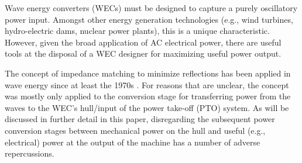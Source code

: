 \documentclass[lettersize,journal]{IEEEtran}
\begin{document}


Wave energy converters (WECs) must be designed to capture a purely oscillatory power input.
Amongst other energy generation technologies (e.g., wind turbines, hydro-electric dams, nuclear power plants), this is a unique characteristic.
However, given the broad application of AC electrical power, there are useful tools at the disposal of a WEC designer for maximizing useful power output.

The concept of impedance matching to minimize reflections has been applied in wave energy since at least the 1970s \cite{Falnes:1980aa}.
For reasons that are unclear, the concept was mostly only applied to the conversion stage for transferring power from the waves to the WEC's hull/input of the power take-off (PTO) system.
As will be discussed in further detail in this paper, disregarding the subsequent power conversion stages between mechanical power on the hull and useful (e.g., electrical) power at the output of the machine has a number of adverse repercussions.
\end{document}
